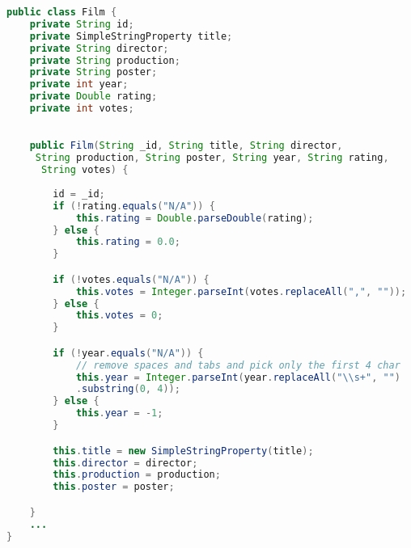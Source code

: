 \begin{lstlisting}[language=Java,  basicstyle=\footnotesize]
public class Film {
	private String id;
	private SimpleStringProperty title;
	private String director;
	private String production;
	private String poster;
	private int year;
	private Double rating;
	private int votes;
	

	public Film(String _id, String title, String director,
	 String production,	String poster, String year, String rating,
	  String votes) {
		
		id = _id;
		if (!rating.equals("N/A")) {
			this.rating = Double.parseDouble(rating);
		} else {
			this.rating = 0.0;
		}

		if (!votes.equals("N/A")) {
			this.votes = Integer.parseInt(votes.replaceAll(",", ""));
		} else {
			this.votes = 0;
		}

		if (!year.equals("N/A")) {
			// remove spaces and tabs and pick only the first 4 char
			this.year = Integer.parseInt(year.replaceAll("\\s+", "")
			.substring(0, 4));
		} else {
			this.year = -1;
		}

		this.title = new SimpleStringProperty(title);
		this.director = director;
		this.production = production;
		this.poster = poster;

	}
	...
}
\end{lstlisting}